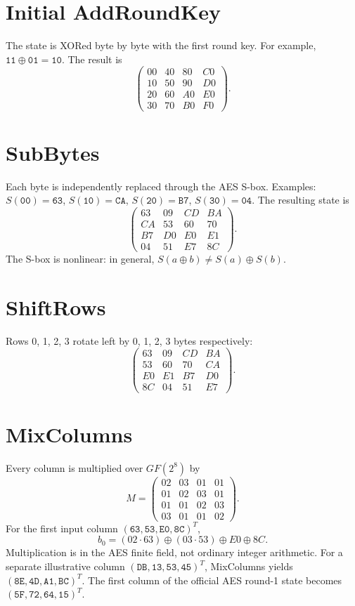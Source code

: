 \documentclass[11pt,a4paper]{report}
\newcommand{\hex}[1]{\texttt{#1}}
\newcommand{\xor}{\mathbin{\oplus}}
\begin{document}
\section{Initial AddRoundKey}
The state is XORed byte by byte with the first round key. For example, \(\hex{11}\xor\hex{01}=\hex{10}\). The result is
\[\begin{pmatrix}00&40&80&C0\\10&50&90&D0\\20&60&A0&E0\\30&70&B0&F0\end{pmatrix}.\]
\section{SubBytes}
Each byte is independently replaced through the AES S-box. Examples: \(S(\hex{00})=\hex{63}\), \(S(\hex{10})=\hex{CA}\), \(S(\hex{20})=\hex{B7}\), \(S(\hex{30})=\hex{04}\). The resulting state is
\[\begin{pmatrix}63&09&CD&BA\\CA&53&60&70\\B7&D0&E0&E1\\04&51&E7&8C\end{pmatrix}.\]
The S-box is nonlinear: in general, \(S(a\xor b)\ne S(a)\xor S(b)\).
\section{ShiftRows}
Rows 0, 1, 2, 3 rotate left by 0, 1, 2, 3 bytes respectively:
\[\begin{pmatrix}63&09&CD&BA\\53&60&70&CA\\E0&E1&B7&D0\\8C&04&51&E7\end{pmatrix}.\]
\section{MixColumns}
Every column is multiplied over \(GF(2^8)\) by
\[M=\begin{pmatrix}02&03&01&01\\01&02&03&01\\01&01&02&03\\03&01&01&02\end{pmatrix}.\]
For the first input column \((\hex{63},\hex{53},\hex{E0},\hex{8C})^T\),
\[b_0=(02\cdot63)\xor(03\cdot53)\xor E0\xor8C.\]
Multiplication is in the AES finite field, not ordinary integer arithmetic. For a separate illustrative column \((\hex{DB},\hex{13},\hex{53},\hex{45})^T\), MixColumns yields \((\hex{8E},\hex{4D},\hex{A1},\hex{BC})^T\). The first column of the official AES round-1 state becomes \((\hex{5F},\hex{72},\hex{64},\hex{15})^T\).
\end{document}
